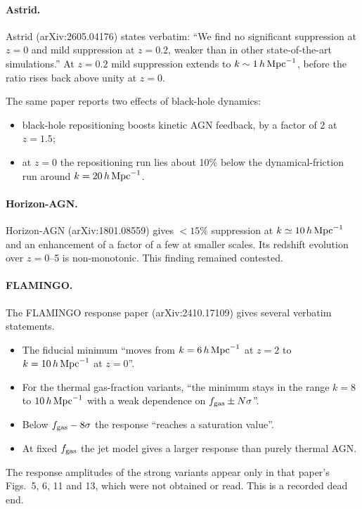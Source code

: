 \documentclass[11pt,a4paper]{article}
\begin{document}
\paragraph{Astrid.} Astrid (arXiv:2605.04176) states verbatim: ``We find no significant suppression at $z = 0$ and mild suppression at $z = 0.2$, weaker than in other state-of-the-art simulations.'' At $z=0.2$ mild suppression extends to $k\sim1\,h\,{\rm Mpc}^{-1}$, before the ratio rises back above unity at $z=0$.

The same paper reports two effects of black-hole dynamics:
\begin{itemize}
\item black-hole repositioning boosts kinetic AGN feedback, by a factor of 2 at $z=1.5$;
\item at $z=0$ the repositioning run lies about 10\% below the dynamical-friction run around $k=20\,h\,{\rm Mpc}^{-1}$.
\end{itemize}

\paragraph{Horizon-AGN.} Horizon-AGN (arXiv:1801.08559) gives $<15\%$ suppression at $k\simeq10\,h\,{\rm Mpc}^{-1}$ and an enhancement of a factor of a few at smaller scales. Its redshift evolution over $z=0$--5 is non-monotonic. This finding remained contested.

\paragraph{FLAMINGO.} The FLAMINGO response paper (arXiv:2410.17109) gives several verbatim statements.
\begin{itemize}
\item The fiducial minimum ``moves from $k = 6\,h\,{\rm Mpc}^{-1}$ at $z = 2$ to $k = 10\,h\,{\rm Mpc}^{-1}$ at $z = 0$''.
\item For the thermal gas-fraction variants, ``the minimum stays in the range $k = 8$ to $10\,h\,{\rm Mpc}^{-1}$ with a weak dependence on $f_{\rm gas}\pm N\sigma$''.
\item Below $f_{\rm gas}-8\sigma$ the response ``reaches a saturation value''.
\item At fixed $f_{\rm gas}$ the jet model gives a larger response than purely thermal AGN.
\end{itemize}
The response amplitudes of the strong variants appear only in that paper's Figs.~5, 6, 11 and 13, which were not obtained or read. This is a recorded dead end.
\end{document}
